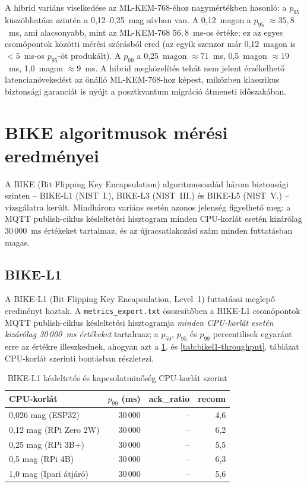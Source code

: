 A hibrid variáns viselkedése az ML-KEM-768-éhoz nagymértékben hasonló: a $p_{95}$
küszöbhatása szintén a 0,12--0,25~mag sávban van. A 0,12~magon a $p_{95}$
$\approx 35{,}8$~ms, ami alacsonyabb, mint az ML-KEM-768 $56{,}8$~ms-os értéke;
ez az egyes csomópontok közötti mérési szórásból ered (az egyik szenzor már
0,12~magon is $<5$~ms-os $p_{95}$-öt produkált). A $p_{99}$ a 0,25~magon
$\approx 71$~ms, 0,5~magon $\approx 19$~ms, 1,0~magon $\approx 9$~ms. A hibrid
megközelítés tehát nem jelent érzékelhető latencianövekedést az önálló ML-KEM-768-hoz
képest, miközben klasszikus biztonsági garanciát is nyújt a posztkvantum migráció
átmeneti időszakában.

\section{BIKE algoritmusok mérési eredményei}

A BIKE (Bit Flipping Key Encapsulation) algoritmuscsalád három biztonsági szinten --
BIKE-L1 (NIST~I.), BIKE-L3 (NIST~III.) és BIKE-L5 (NIST~V.) -- vizsgálatra került.
Mindhárom variáns esetén azonos jelenség figyelhető meg: a MQTT publish-ciklus
késleltetési hisztogram minden CPU-korlát esetén kizárólag 30\,000~ms értékeket
tartalmaz, és az újracsatlakozási szám minden futtatásban magas.

\subsection{BIKE-L1}

A BIKE-L1 (Bit Flipping Key Encapsulation, Level~1) futtatásai meglepő eredményt hoztak.
A \texttt{metrics\_export.txt} összesítőben a BIKE-L1 csomópontok MQTT
publish-ciklus késleltetési hisztogramja \emph{minden CPU-korlát esetén kizárólag
30\,000~ms értékeket} tartalmaz; a $p_{50}$, $p_{95}$ és $p_{99}$ percentilisek egyaránt
erre az értékre illeszkednek, ahogyan azt a \ref{tab:bikel1-latency}. és
\ref{tab:bikel1-throughput}. táblázat CPU-korlát szerinti bontásban részletezi.

\begin{table}[ht]
\centering
\caption{BIKE-L1 késleltetés és kapcsolatminőség CPU-korlát szerint}
\label{tab:bikel1-latency}
\begin{tabular}{lrrr}
\hline
\textbf{CPU-korlát} & \textbf{$p_{99}$ (ms)} & \textbf{ack\_ratio} & \textbf{reconn} \\
\hline
0,026 mag (ESP32)       & 30\,000 & -- & 4,6 \\
0,12 mag (RPi Zero 2W)  & 30\,000 & -- & 6,2 \\
0,25 mag (RPi 3B+)      & 30\,000 & -- & 5,5 \\
0,5 mag (RPi 4B)        & 30\,000 & -- & 6,3 \\
1,0 mag (Ipari átjáró)  & 30\,000 & -- & 5,6 \\
\hline
\end{tabular}
\end{table}

